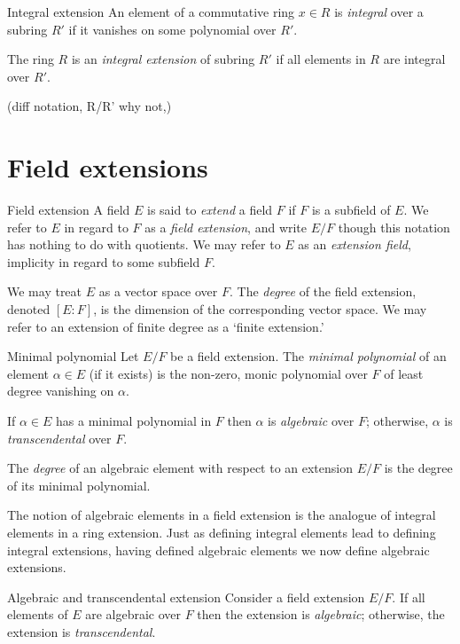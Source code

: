 \begin{definition}{Integral extension}
    An element of a commutative ring $x\in R$ is \emph{integral} over a subring $R'$ if it vanishes on some polynomial over $R'$.

    The ring $R$ is an \emph{integral extension} of subring $R'$ if all elements in $R$ are integral over $R'$.
\end{definition}
(diff notation, R/R' why not,)


\section{Field extensions}

\begin{definition}{Field extension}
    A field $E$ is said to \emph{extend} a field $F$ if $F$ is a subfield of $E$.
    We refer to $E$ in regard to $F$ as a \emph{field extension}, and write $E/F$ though this notation has nothing to do with quotients.
    We may refer to $E$ as an \emph{extension field}, implicity in regard to some subfield $F$.

    We may treat $E$ as a vector space over $F$.
    The \emph{degree} of the field extension, denoted $[E:F]$, is the dimension of the corresponding vector space.
    We may refer to an extension of finite degree as a `finite extension.'
\end{definition}

\begin{definition}{Minimal polynomial}
    Let $E/F$ be a field extension.
    The \emph{minimal polynomial} of an element $\alpha\in E$ (if it exists) is the non-zero, monic polynomial over $F$ of least degree vanishing on $\alpha$.

    If $\alpha\in E$ has a minimal polynomial in $F$ then $\alpha$ is \emph{algebraic} over $F$; otherwise, $\alpha$ is \emph{transcendental} over $F$.

    The \emph{degree} of an algebraic element with respect to an extension $E/F$ is the degree of its minimal polynomial.
\end{definition}

The notion of algebraic elements in a field extension is the analogue of integral elements in a ring extension.
Just as defining integral elements lead to defining integral extensions, having defined algebraic elements we now define algebraic extensions.

\begin{definition}{Algebraic and transcendental extension}
    Consider a field extension $E/F$.
    If all elements of $E$ are algebraic over $F$ then the extension is \emph{algebraic}; otherwise, the extension is \emph{transcendental}.
\end{definition}


